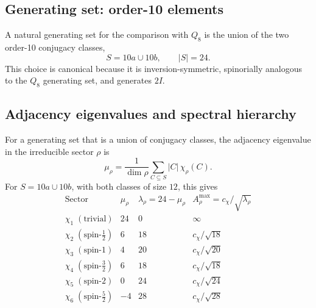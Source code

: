 \documentclass[11pt,a4paper]{article}
\begin{document}
  \subsection{Generating set: order-10 elements}
    \label{sec:step5-genset}

    A natural generating set for the comparison with $Q_8$ is the union of
    the two order-10 conjugacy classes,
    \begin{equation}
      S = 10a \cup 10b,
      \qquad
      |S| = 24.
      \label{eq:S-2I}
    \end{equation}
    This choice is canonical because it is inversion-symmetric, spinorially
    analogous to the $Q_8$ generating set, and generates $2I$.

  \subsection{Adjacency eigenvalues and spectral hierarchy}
    \label{sec:step5-spectrum}

    For a generating set that is a union of conjugacy classes, the adjacency
    eigenvalue in the irreducible sector $\rho$ is
    \begin{equation}
      \mu_\rho
      = \frac{1}{\dim\rho}
      \sum_{C \subseteq S} |C|\,\chi_\rho(C).
      \label{eq:mu-formula-2I}
    \end{equation}
    For $S = 10a \cup 10b$, with both classes of size $12$, this gives
    \begin{equation}
      \renewcommand{\arraystretch}{1.4}
      \begin{array}{l|ccc}
        \text{Sector} &
        \mu_\rho &
        \lambda_\rho = 24 - \mu_\rho &
        A^{\max}_\rho = c_\chi/\sqrt{\lambda_\rho} \\
        \hline
        \chi_1\;(\text{trivial}) & 24 & 0  & \infty \\
        \chi_2\;(\text{spin-}{\tfrac{1}{2}}) & 6  & 18 & c_\chi/\sqrt{18} \\
        \chi_3\;(\text{spin-}1) & 4  & 20 & c_\chi/\sqrt{20} \\
        \chi_4\;(\text{spin-}{\tfrac{3}{2}}) & 6  & 18 & c_\chi/\sqrt{18} \\
        \chi_5\;(\text{spin-}2) & 0  & 24 & c_\chi/\sqrt{24} \\
        \chi_6\;(\text{spin-}{\tfrac{5}{2}}) & -4 & 28 & c_\chi/\sqrt{28}
      \end{array}
      \label{eq:2I-spectrum}
    \end{equation}
\end{document}
